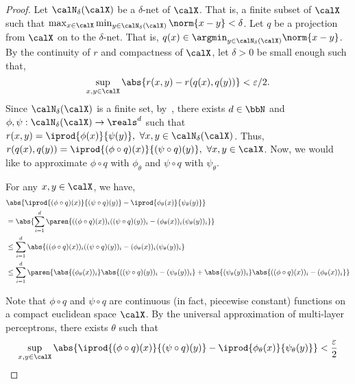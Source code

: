 \begin{proof}
    Let $\calN_\delta(\calX)$ be a $\delta$-net of $\calX$. That is, a finite subset of $\calX$ such that $\max_{x \in \calX} \min_{y \in \calN_\delta(\calX)} \norm{x - y} < \delta$. Let $q$ be a projection from $\calX$ on to the $\delta$-net. That is, $q(x) \in \argmin_{y \in \calN_\delta(\calX)} \norm{x - y}$. By the continuity of $r$ and compactness of $\calX$, let $\delta > 0$ be small enough such that,
    \begin{equation*}
        \sup_{x, y \in \calX} \abs{r(x,y) - r(q(x), q(y))} < \varepsilon / 2.
    \end{equation*}
    Since $\calN_\delta(\calX)$ is a finite set, by~, there exists $d \in \bbN$ and $\phi, \psi: \calN_\delta(\calX) \to \reals^d$ such that $r(x, y) = \iprod{\phi(x)}{\psi(y)}, \ \forall x,y \in \calN_\delta(\calX)$. Thus, $r(q(x), q(y)) = \iprod{(\phi \circ q)(x)}{(\psi \circ q)(y)}, \ \forall x,y \in \calX$.  Now, we would like to approximate $\phi \circ q$ with $\phi_\theta$ and $\psi \circ q$ with $\psi_\theta$.

    For any $x, y \in \calX$, we have,
    \begin{equation*}
        \begin{split}
            &\abs{\iprod{(\phi \circ q)(x)}{(\psi \circ q)(y)} - \iprod{\phi_\theta(x)}{\psi_\theta(y)}} \\
            &= \abs{\sum_{i=1}^{d} \paren{((\phi \circ q)(x))_i ((\psi \circ q)(y))_i - (\phi_\theta(x))_i (\psi_\theta(y))_i}} \\
            &\leq \sum_{i=1}^{d} \abs{((\phi \circ q)(x))_i ((\psi \circ q)(y))_i - (\phi_\theta(x))_i (\psi_\theta(y))_i} \\
        &\leq \sum_{i=1}^d \paren{ \abs{(\phi_\theta(x))_i} \abs{((\psi \circ q)(y))_i - (\psi_\theta(y))_i} + \abs{(\psi_\theta(y))_i} \abs{((\phi \circ q)(x))_i - (\phi_\theta(x))_i}} \\
    \end{split}
\end{equation*}

Note that $\phi \circ q$ and $\psi \circ q$ are continuous (in fact, piecewise constant) functions on a compact euclidean space $\calX$. By the universal approximation of multi-layer perceptrons, there exists $\theta$ such that
\begin{equation*}
    \sup_{x, y \in \calX} \abs{\iprod{(\phi \circ q)(x)}{(\psi \circ q)(y)} - \iprod{\phi_\theta(x)}{\psi_\theta(y)}} < \frac{\varepsilon}{2}
\end{equation*}


\end{proof}
